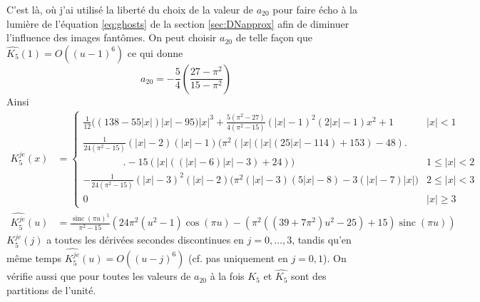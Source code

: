 \documentclass[11pt,twoside]{article}
\DeclareMathOperator{\sinc}{sinc}
\newcommand{\nn}{\nonumber}
\begin{document}
C'est là, où j'ai utilisé la liberté du choix de la valeur de $a_{20}$ pour faire écho à la lumière de l'équation \ref{eq:ghosts} de la section \ref{sec:DNapprox} afin de diminuer l'influence des images fantômes. On peut choisir $a_{20}$ de telle façon que $\widehat{K_5}(1)=O((u-1)^6)$ ce qui donne
\begin{equation}
a_{20} = -\frac{5}{4}\left(\frac{27-\pi^2}{15-\pi^2}\right)
\end{equation}
Ainsi
\begin{align}
K^{je}_5(x) &= \begin{cases}
\frac{1}{12} \Big((138-55 |x|) |x|-95\Big) |x|^3+\frac{5 \left(\pi ^2-27\right)}{4 \left(\pi^2-15\right)} (|x|-1)^2 (2 |x|-1) x^2 +1& |x|< 1 \\
\frac{1}{24 \left(\pi^2-15\right)}(|x|-2) (|x|-1) \Big(\pi ^2 (|x| (|x| (25 |x|-114)+153)-48)\Big.& \nn\\
\qquad\qquad \Big.-15 (|x| ((|x|-6) |x|-3)+24)\Big)& 1\leq |x|<2 \nn\\
-\frac{1}{24 \left(\pi ^2-15\right)}(|x|-3)^2 (|x|-2) \Big(\pi^2 (|x|-3) (5 |x|-8)-3 (|x|-7) |x|\Big) & 2\leq |x|<3 \nn \\
0 & |x| \geq 3
\end{cases}\\
\widehat{K^{je}_5}(u)&= \frac{\sinc(\pi u)^5}{\pi^2-15} \left(24 \pi^2 (u^2-1) \cos (\pi u)-(\pi^2 ((39+7 \pi^2) u^2-25)+15) \sinc(\pi  u)\right)
\label{eq:quinticJE-kernel}
\end{align}
$K^{je}_5(j)$ a toutes les dérivées secondes discontinues en $j=0,\dots,3$, tandis qu'en même temps  $\widehat{K^{je}_5}(u)=O((u-j)^6)$ (cf. pas uniquement en $j=0,1$). On vérifie aussi que pour toutes les valeurs de $a_{20}$ à la fois $K_5$ et $\widehat{K_5}$ sont des partitions de l'unité.
\end{document}
